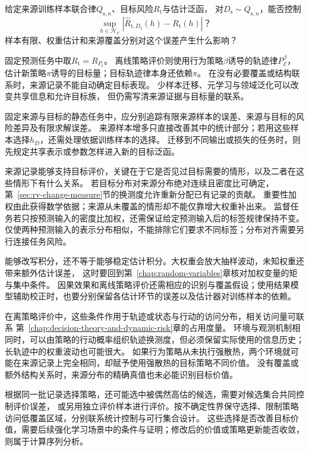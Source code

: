 \begin{mathproblem}[有限来源训练样本的目标风险误差]
  \label{question:future-source-target-estimation}
  给定来源训练样本联合律$Q_{{\mathrm s},n}$、目标风险$R_{\mathrm t}$与估计泛函，
  对$D_{\mathrm s}\sim Q_{{\mathrm s},n}$，能否控制
  \[
    \sup_{h\in\mathcal H_{\mathcal C}}
    |\widehat R_{\mathrm t,D_{\mathrm s}}(h)-R_{\mathrm t}(h)|\text{？}
  \]
  样本有限、权重估计和来源覆盖分别对这个误差产生什么影响？
\end{mathproblem}



固定预测任务中取$R_{\mathrm t}=R_{P_{\mathrm t}}$。
离线策略评价则使用行为策略$\beta$诱导的轨迹律$P_{\mathcal E}^{\beta}$，
估计新策略$\pi$诱导的目标量；目标轨迹律本身还依赖$\pi$。
在没有必要覆盖或结构联系时，来源记录不能自动确定目标表现。
少样本迁移、元学习与领域泛化可以改变共享信息和允许目标族，
但仍需写清来源证据与目标量的联系。

固定来源与目标的静态任务中，应分别追踪有限来源样本的误差、来源与目标的风险差异及有限求解误差。
来源样本增多只直接改善其中的统计部分；若用这些样本选择$h_D$，还需处理依据训练样本的选择。
迁移到不同输出或损失的任务时，则先规定共享表示或参数怎样进入新的目标泛函。

来源记录能够支持目标评价，关键在于它是否见过目标需要的情形，以及二者在这些情形下有什么关系。
若目标分布对来源分布绝对连续且密度比可确定，第~\ref{sec:rv-change-measure}节的换测度允许重新分配已有记录的贡献。
重要性加权由此获得数学依据；来源从未覆盖的情形却不能仅靠增大权重补出来。
监督任务若只按预测输入的密度比加权，还需保证给定预测输入后的标签规律保持不变。
仅使两种预测输入的表示分布相似，不能排除它们要求不同标签；分布对齐需要另行连接任务风险。

能够改写积分，还不等于能够稳定估计积分。大权重会放大抽样波动，未知权重还带来额外估计误差，
这时要回到第~\ref{chap:random-variables}章核对加权变量的矩与集中条件。
因果效果和离线策略评价还需相应的识别与覆盖假设；使用结果模型辅助校正时，也要分别保留各估计环节的误差以及估计器对训练样本的依赖。

在离策略评价中，这些条件作用于轨迹或状态与行动的访问分布，相关访问量可联系
第~\ref{chap:decision-theory-and-dynamic-risk}章的占用度量。
环境与观测机制相同时，可以由策略的行动概率组织轨迹换测度，但必须保留实际使用的信息历史；
长轨迹中的权重波动也可能很大。
如果行为策略从未执行强散热，两个环境就可能在来源记录上完全相同，却赋予使用强散热的目标策略不同价值。
没有覆盖或额外结构关系时，来源分布的精确真值也未必能识别目标价值。

根据同一批记录选择策略，还可能选中被偶然高估的候选，需要对候选集合共同控制评价误差，
或另用独立评价样本进行评价。按不确定性界保守选择、限制策略访问低覆盖区域，分别联系统计控制与可行集合设计。
这些选择是否改善目标价值，需要后续强化学习场景中的条件与证明；修改后的价值或策略更新能否收敛，则属于计算序列分析。

